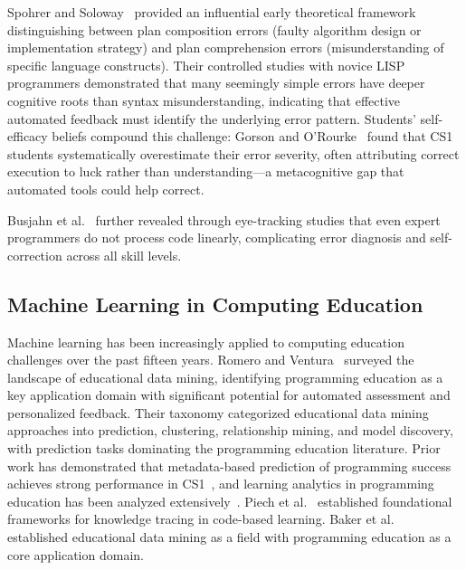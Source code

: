 \documentclass[acmsmall]{acmart}
\begin{document}
Spohrer and Soloway~\cite{spohrer1986novice} provided an influential early
theoretical framework distinguishing between plan composition errors (faulty
algorithm design or implementation strategy) and plan comprehension errors
(misunderstanding of specific language constructs). Their controlled studies
with novice LISP programmers demonstrated that many seemingly simple errors
have deeper cognitive roots than syntax misunderstanding, indicating that
effective automated feedback must identify the underlying error pattern. Students' self-efficacy beliefs compound this challenge: Gorson and O'Rourke~\cite{gorson2020why} found that CS1 students systematically overestimate their error severity, often attributing correct execution to luck rather than understanding---a metacognitive gap that automated tools could help correct.

Busjahn et al.~\cite{busjahn2015eye} further revealed through eye-tracking studies that even expert programmers do not process code linearly, complicating error diagnosis and self-correction across all skill levels. 

\subsection{Machine Learning in Computing Education}

Machine learning has been increasingly applied to computing education
challenges over the past fifteen years. Romero and
Ventura~\cite{romero2013data}
surveyed the landscape of educational data mining, identifying programming
education as a key application domain with significant potential for automated
assessment and personalized feedback. Their taxonomy categorized educational
data mining approaches into prediction, clustering, relationship mining, and
model discovery, with prediction tasks dominating the programming education
literature. Prior work has demonstrated that
metadata-based prediction of programming success achieves strong performance in CS1~\cite{jadud2006methods,altadmri2015most},
and learning analytics in programming education has been analyzed extensively~\cite{romero2013data,baker2009educational}. Piech et al.~\cite{piech2015deep} established
foundational frameworks for knowledge tracing in code-based learning. Baker et
al.~\cite{baker2009educational} established educational data mining as a field with
programming education as a core application domain.
\end{document}
